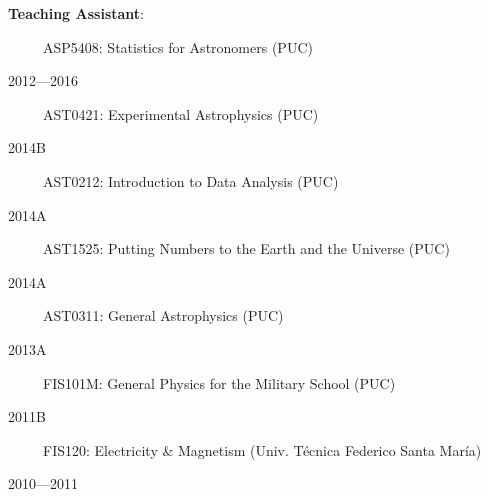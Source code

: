\documentclass[11pt, a4paper]{article} %
\begin{document}
\begin{flushleft}%
  \setlength{\leftskip}{0.2cm}%
\textbf{Teaching Assistant}:
\end{flushleft}
\begin{minipage}[t]{0.6\textwidth}
\ \ \ \ \ ASP5408: Statistics for Astronomers (PUC)
\end{minipage}
\begin{minipage}[t]{0.4\textwidth}
\hfill 2012---2016
\end{minipage}
\begin{minipage}[t]{0.7\textwidth}
\ \ \ \ \ AST0421: Experimental Astrophysics (PUC)
\end{minipage}
\begin{minipage}[t]{0.3\textwidth}
\hfill 2014B
\end{minipage}
\begin{minipage}[t]{0.7\textwidth}
\ \ \ \ \ AST0212: Introduction to Data Analysis (PUC)
\end{minipage}
\begin{minipage}[t]{0.3\textwidth}
\hfill 2014A
\end{minipage}
\begin{minipage}[t]{0.7\textwidth}
\ \ \ \ \ AST1525: Putting Numbers to the Earth and the Universe (PUC)
\end{minipage}
\begin{minipage}[t]{0.3\textwidth}
\hfill 2014A
\end{minipage}
\begin{minipage}[t]{0.7\textwidth}
\ \ \ \ \ AST0311: General Astrophysics (PUC)
\end{minipage}
\begin{minipage}[t]{0.3\textwidth}
\hfill 2013A
\end{minipage}
\begin{minipage}[t]{0.7\textwidth}
\ \ \ \ \ FIS101M: General Physics for the Military School (PUC)
\end{minipage}
\begin{minipage}[t]{0.3\textwidth}
\hfill 2011B
\end{minipage}
\begin{minipage}[t]{0.7\textwidth}
\ \ \ \ \ FIS120: Electricity \& Magnetism (Univ. T\'ecnica Federico Santa Mar\'ia)
\end{minipage}
\begin{minipage}[t]{0.3\textwidth}
\hfill 2010---2011
\end{minipage}
\end{document}
